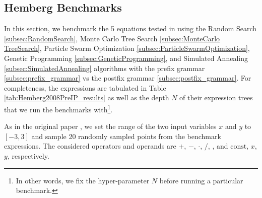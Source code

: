 \documentclass[runningheads]{llncs}
\newcommand\specialcaret{%
  \stackengine{0pt}{\ \,}{\scalebox{1.1}[2]{\raisebox{-0.9ex}{\string^}}}{O}{c}{F}{T}{L}}
\begin{document}
\subsection{Hemberg Benchmarks} \label{subsec:HembergBenchmarks}
In this section, we benchmark the 5 equations tested in \cite{hemberg2008pre} using the Random Search \ref{subsec:RandomSearch}, Monte Carlo Tree Search \ref{subsec:MonteCarlo TreeSearch}, Particle Swarm Optimization \ref{subsec:ParticleSwarmOptimization}, Genetic Programming \ref{subsec:GeneticProgramming}, and Simulated Annealing \ref{subsec:SimulatedAnnealing} algorithms with the prefix grammar \ref{subsec:prefix_grammar} vs the postfix grammar \ref{subsec:postfix_grammar}. For completeness, the expressions are tabulated in Table \ref{tab:Hemberg2008PreIP_results} as well as the depth $N$ of their expression trees that we run the benchmarks with\footnote{In other words, we fix the hyper-parameter $N$ before running a particular benchmark.}.
\par As in the original paper \cite{hemberg2008pre}, we set the range of the two input variables $x$ and $y$ to $[-3,3]$ and sample 20 randomly sampled points from the benchmark expressions.  The considered operators and operands are $+$, $-$, $\cdot$, $/$, \specialcaret , and $\mathrm{const}$, $x$, $y$, respectively.
\end{document}
